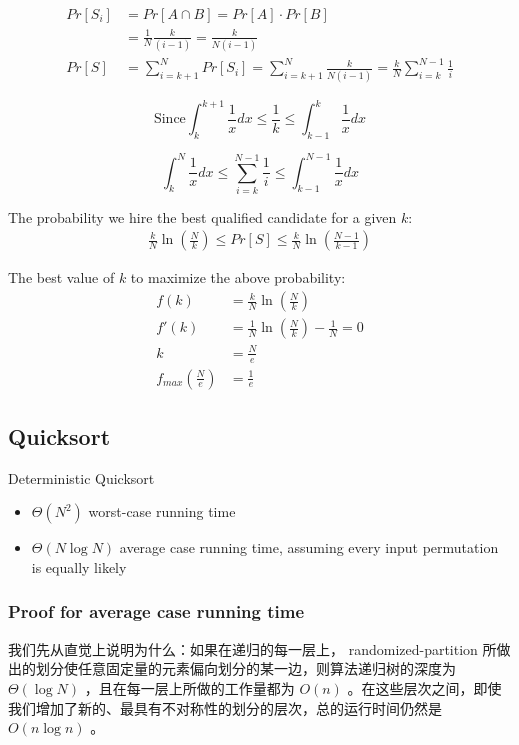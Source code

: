 \documentclass{article}
\begin{document}
\begin{align*}
    Pr[S_i]&=Pr[A\cap B]=Pr[A]\cdot Pr[B]\\
    &=\frac{1}{N}\frac{k}{(i-1)}=\frac{k}{N(i-1)}\\
    Pr[S]&=\sum_{i=k+1}^N Pr[S_i]=\sum_{i=k+1}^N\frac{k}{N(i-1)}=\frac{k}{N}\sum_{i=k}^{N-1}\frac{1}{i}
\end{align*}

$$\text{Since} \int_k^{k+1} \frac{1}{x} dx \le \frac{1}{k} \le \int_{k-1}^{k} \frac{1}{x} dx$$

$$\int_k^N \frac{1}{x} dx \le \sum\limits_{i=k}^{N-1}\frac{1}{i} \le \int_{k-1}^{N-1} \frac{1}{x} dx$$

The probability we hire the best qualified candidate for a given $k$:
\begin{align*}
    \frac{k}{N}\ln\left( \frac{N}{k} \right)\le Pr[S] \le \frac{k}{N}\ln\left( \frac{N-1}{k-1} \right)
\end{align*}

The best value of $k$ to maximize the above probability:
\begin{align*}
    f(k)&=\frac{k}{N}\ln\left( \frac{N}{k} \right)\\
    f'(k)&=\frac{1}{N}\ln\left( \frac{N}{k} \right)-\frac{1}{N}=0\\
    k&=\frac{N}{e}\\
    f_{max}\left(\frac{N}{e}\right)&=\frac{1}{e}
\end{align*}

\subsection{Quicksort}
Deterministic Quicksort
\begin{itemize}
    \item $\Theta (N^2)$ worst-case running time
    \item $\Theta(N \log N)$ average case running time, assuming every input permutation is equally likely    
\end{itemize}

\subsubsection{Proof for average case running time}

我们先从直觉上说明为什么：如果在递归的每一层上， randomized-partition 所做出的划分使任意固定量的元素偏向划分的某一边，则算法递归树的深度为 $\Theta(\log N)$ ，且在每一层上所做的工作量都为 $O(n)$ 。在这些层次之间，即使我们增加了新的、最具有不对称性的划分的层次，总的运行时间仍然是 $O(n \log n)$ 。
\end{document}
